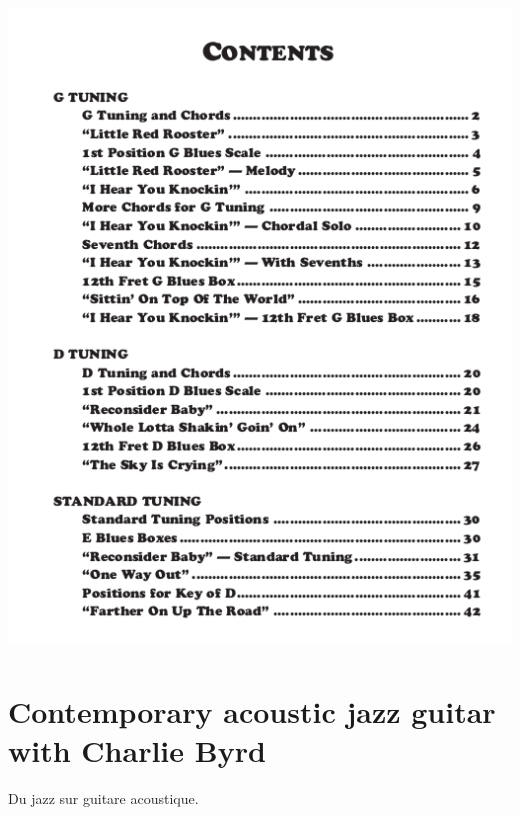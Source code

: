 \documentclass[a4paper]{book}
\begin{document}
\begin{center}
\includegraphics[width=13.518cm,height=17.037cm]{lebluessupportsmethodes-img59.png}
\end{center}
\clearpage


\section[Contemporary acoustic jazz guitar with Charlie
Byrd]{Contemporary acoustic jazz guitar with Charlie Byrd}
\hypertarget{RefHeadingToc130973218262}{}Du jazz sur guitare acoustique.
\end{document}
